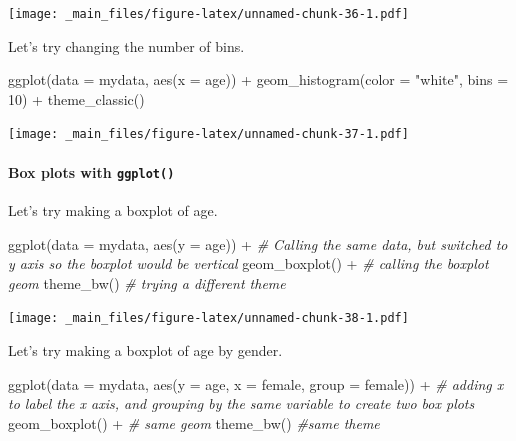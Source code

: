 \documentclass[
]{book}
\newenvironment{Shaded}{\begin{snugshade}}{\end{snugshade}}
\newcommand{\AttributeTok}[1]{\textcolor[rgb]{0.77,0.63,0.00}{#1}}
\newcommand{\CommentTok}[1]{\textcolor[rgb]{0.56,0.35,0.01}{\textit{#1}}}
\newcommand{\DecValTok}[1]{\textcolor[rgb]{0.00,0.00,0.81}{#1}}
\newcommand{\FunctionTok}[1]{\textcolor[rgb]{0.00,0.00,0.00}{#1}}
\newcommand{\NormalTok}[1]{#1}
\newcommand{\SpecialCharTok}[1]{\textcolor[rgb]{0.00,0.00,0.00}{#1}}
\newcommand{\StringTok}[1]{\textcolor[rgb]{0.31,0.60,0.02}{#1}}
\begin{document}
\texttt{[image: \_main\_files/figure-latex/unnamed-chunk-36-1.pdf]}

Let's try changing the number of bins.

\begin{Shaded}
\begin{Highlighting}[]
\FunctionTok{ggplot}\NormalTok{(}\AttributeTok{data =}\NormalTok{ mydata, }\FunctionTok{aes}\NormalTok{(}\AttributeTok{x =}\NormalTok{ age)) }\SpecialCharTok{+}
  \FunctionTok{geom\_histogram}\NormalTok{(}\AttributeTok{color =} \StringTok{"white"}\NormalTok{, }\AttributeTok{bins =} \DecValTok{10}\NormalTok{) }\SpecialCharTok{+}
  \FunctionTok{theme\_classic}\NormalTok{()}
\end{Highlighting}
\end{Shaded}

\texttt{[image: \_main\_files/figure-latex/unnamed-chunk-37-1.pdf]}

\hypertarget{boxplot}{%
\paragraph*{\texorpdfstring{Box plots with \texttt{ggplot()}}{Box plots with ggplot()}}\label{boxplot}}

Let's try making a boxplot of age.

\begin{Shaded}
\begin{Highlighting}[]
\FunctionTok{ggplot}\NormalTok{(}\AttributeTok{data =}\NormalTok{ mydata, }\FunctionTok{aes}\NormalTok{(}\AttributeTok{y =}\NormalTok{ age)) }\SpecialCharTok{+} \CommentTok{\# Calling the same data, but switched to y axis so the boxplot would be vertical}
  \FunctionTok{geom\_boxplot}\NormalTok{() }\SpecialCharTok{+} \CommentTok{\# calling the boxplot geom}
  \FunctionTok{theme\_bw}\NormalTok{() }\CommentTok{\# trying a different theme}
\end{Highlighting}
\end{Shaded}

\texttt{[image: \_main\_files/figure-latex/unnamed-chunk-38-1.pdf]}

Let's try making a boxplot of age by gender.

\begin{Shaded}
\begin{Highlighting}[]
\FunctionTok{ggplot}\NormalTok{(}\AttributeTok{data =}\NormalTok{ mydata, }\FunctionTok{aes}\NormalTok{(}\AttributeTok{y =}\NormalTok{ age, }\AttributeTok{x =}\NormalTok{ female, }\AttributeTok{group =}\NormalTok{ female)) }\SpecialCharTok{+} 
  \CommentTok{\# adding x to label the x axis, and grouping by the same variable to create two box plots}
  \FunctionTok{geom\_boxplot}\NormalTok{() }\SpecialCharTok{+} \CommentTok{\# same geom}
  \FunctionTok{theme\_bw}\NormalTok{() }\CommentTok{\#same theme}
\end{Highlighting}
\end{Shaded}
\end{document}
